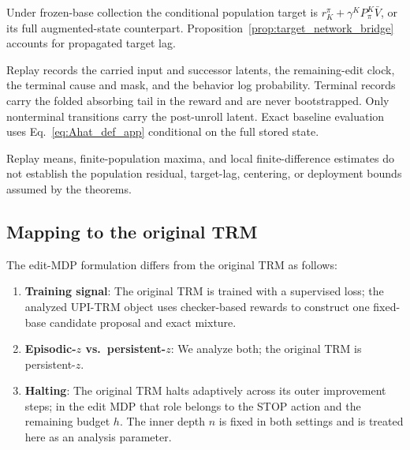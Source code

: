 \documentclass{article}
\theoremstyle{plain}
\theoremstyle{definition}
\theoremstyle{remark}
\begin{document}
Under frozen-base collection the conditional population target is
$r_K^\pi+\gamma^K P_\pi^K\bar V$, or its full augmented-state counterpart.
Proposition~\ref{prop:target_network_bridge} accounts for propagated target lag.

Replay records the carried input and successor latents, the remaining-edit clock, the terminal cause and mask, and the behavior log probability. Terminal records carry the folded absorbing tail in the reward and are never bootstrapped. Only
nonterminal transitions carry the post-unroll latent. Exact baseline evaluation
uses Eq.~\eqref{eq:Ahat_def_app} conditional on the full stored state.

Replay means, finite-population maxima, and local finite-difference estimates
do not establish the population residual, target-lag, centering, or deployment
bounds assumed by the theorems.

\subsection{Mapping to the original TRM}
\label{app:trm_mapping}



The edit-MDP formulation differs from the original TRM as follows:
\begin{enumerate}
\item \textbf{Training signal}: The original TRM is trained with a supervised
loss; the analyzed UPI-TRM object uses checker-based rewards to construct one
fixed-base candidate proposal and exact mixture.
\item \textbf{Episodic-$z$ vs.\ persistent-$z$}: We analyze both; the original TRM is persistent-$z$.
\item \textbf{Halting}: The original TRM halts adaptively across its outer improvement steps; in the edit MDP that role belongs to the STOP action and the remaining budget $h$. The inner depth $n$ is fixed in both settings and is treated here as an analysis parameter.
\end{enumerate}
\end{document}
